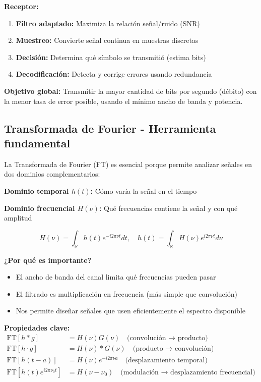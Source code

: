 \documentclass[10pt,a4paper]{article}
\begin{document}
\textbf{Receptor:}
\begin{enumerate}
\item \textbf{Filtro adaptado:} Maximiza la relación señal/ruido (SNR)
\item \textbf{Muestreo:} Convierte señal continua en muestras discretas
\item \textbf{Decisión:} Determina qué símbolo se transmitió (estima bits)
\item \textbf{Decodificación:} Detecta y corrige errores usando redundancia
\end{enumerate}

\textbf{Objetivo global:} Transmitir la mayor cantidad de bits por segundo (débito) con la menor tasa de error posible, usando el mínimo ancho de banda y potencia.

\subsection{Transformada de Fourier - Herramienta fundamental}

La Transformada de Fourier (FT) es esencial porque permite analizar señales en dos dominios complementarios:

\textbf{Dominio temporal $h(t)$:} Cómo varía la señal en el tiempo

\textbf{Dominio frecuencial $H(\nu)$:} Qué frecuencias contiene la señal y con qué amplitud

$$H(\nu) = \int_{\mathbb{R}} h(t)e^{-i2\pi\nu t}dt, \quad h(t) = \int_{\mathbb{R}} H(\nu)e^{i2\pi\nu t}d\nu$$

\textbf{¿Por qué es importante?}
\begin{itemize}
\item El ancho de banda del canal limita qué frecuencias pueden pasar
\item El filtrado es multiplicación en frecuencia (más simple que convolución)
\item Nos permite diseñar señales que usen eficientemente el espectro disponible
\end{itemize}

\textbf{Propiedades clave:}
\begin{align*}
\text{FT}[h * g] &= H(\nu)G(\nu) \quad \text{(convolución → producto)}\\
\text{FT}[h \cdot g] &= H(\nu) * G(\nu) \quad \text{(producto → convolución)}\\
\text{FT}[h(t-a)] &= H(\nu)e^{-i2\pi\nu a} \quad \text{(desplazamiento temporal)}\\
\text{FT}[h(t)e^{i2\pi\nu_0 t}] &= H(\nu-\nu_0) \quad \text{(modulación → desplazamiento frecuencial)}
\end{align*}
\end{document}
